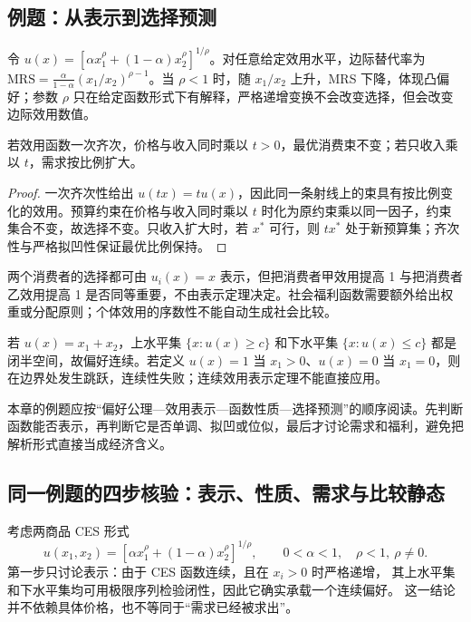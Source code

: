 \subsection{例题：从表示到选择预测}

\begin{example}
令 $u(x)=\left[\alpha x_1^\rho+(1-\alpha)x_2^\rho\right]^{1/\rho}$。对任意给定效用水平，边际替代率为
$\mathrm{MRS}=\frac{\alpha}{1-\alpha}(x_1/x_2)^{\rho-1}$。当 $\rho<1$ 时，随 $x_1/x_2$ 上升，MRS 下降，体现凸偏好；参数 $\rho$ 只在给定函数形式下有解释，严格递增变换不会改变选择，但会改变边际效用数值。
\end{example}

\begin{proposition}[位似偏好的需求比例]
若效用函数一次齐次，价格与收入同时乘以 $t>0$，最优消费束不变；若只收入乘以 $t$，需求按比例扩大。
\end{proposition}
\begin{proof}
一次齐次性给出 $u(tx)=tu(x)$，因此同一条射线上的束具有按比例变化的效用。预算约束在价格与收入同时乘以 $t$ 时化为原约束乘以同一因子，约束集合不变，故选择不变。只收入扩大时，若 $x^*$ 可行，则 $tx^*$ 处于新预算集；齐次性与严格拟凹性保证最优比例保持。
\end{proof}

\begin{example}[效用表示与福利判断的区别]
两个消费者的选择都可由 $u_i(x)=x$ 表示，但把消费者甲效用提高 1 与把消费者乙效用提高 1 是否同等重要，不由表示定理决定。社会福利函数需要额外给出权重或分配原则；个体效用的序数性不能自动生成社会比较。
\end{example}

\begin{example}[连续性检验]
若 $u(x)=x_1+x_2$，上水平集 $\{x:u(x)\ge c\}$ 和下水平集 $\{x:u(x)\le c\}$ 都是闭半空间，故偏好连续。若定义 $u(x)=1$ 当 $x_1>0$、$u(x)=0$ 当 $x_1=0$，则在边界处发生跳跃，连续性失败；连续效用表示定理不能直接应用。
\end{example}

\begin{remark}
本章的例题应按“偏好公理—效用表示—函数性质—选择预测”的顺序阅读。先判断函数能否表示，再判断它是否单调、拟凹或位似，最后才讨论需求和福利，避免把解析形式直接当成经济含义。
\end{remark}

\subsection{同一例题的四步核验：表示、性质、需求与比较静态}
考虑两商品 CES 形式
\[
 u(x_1,x_2)=\left[\alpha x_1^\rho+(1-\alpha)x_2^\rho\right]^{1/\rho},
 \qquad 0<\alpha<1,\quad \rho<1,\ \rho\ne0.
\]
第一步只讨论表示：由于 CES 函数连续，且在 $x_i>0$ 时严格递增，
其上水平集和下水平集均可用极限序列检验闭性，因此它确实承载一个连续偏好。
这一结论并不依赖具体价格，也不等同于“需求已经被求出”。

